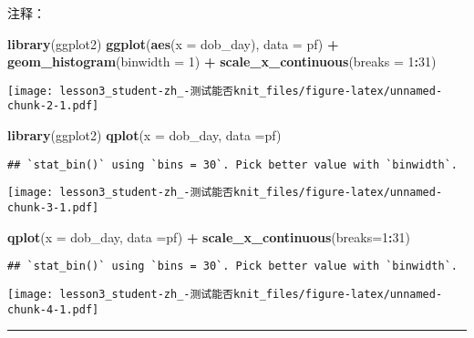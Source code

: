 \documentclass[]{article}
\newenvironment{Shaded}{\begin{snugshade}}{\end{snugshade}}
\newcommand{\DataTypeTok}[1]{\textcolor[rgb]{0.13,0.29,0.53}{#1}}
\newcommand{\DecValTok}[1]{\textcolor[rgb]{0.00,0.00,0.81}{#1}}
\newcommand{\KeywordTok}[1]{\textcolor[rgb]{0.13,0.29,0.53}{\textbf{#1}}}
\newcommand{\NormalTok}[1]{#1}
\newcommand{\OperatorTok}[1]{\textcolor[rgb]{0.81,0.36,0.00}{\textbf{#1}}}
\newcommand{\StringTok}[1]{\textcolor[rgb]{0.31,0.60,0.02}{#1}}
\begin{document}
注释：

\begin{Shaded}
\begin{Highlighting}[]
\KeywordTok{library}\NormalTok{(ggplot2)}
\KeywordTok{ggplot}\NormalTok{(}\KeywordTok{aes}\NormalTok{(}\DataTypeTok{x =}\NormalTok{ dob_day), }\DataTypeTok{data =}\NormalTok{ pf) }\OperatorTok{+}\StringTok{ }
\StringTok{  }\KeywordTok{geom_histogram}\NormalTok{(}\DataTypeTok{binwidth =} \DecValTok{1}\NormalTok{) }\OperatorTok{+}\StringTok{ }
\StringTok{  }\KeywordTok{scale_x_continuous}\NormalTok{(}\DataTypeTok{breaks =} \DecValTok{1}\OperatorTok{:}\DecValTok{31}\NormalTok{)}
\end{Highlighting}
\end{Shaded}

\texttt{[image: lesson3\_student-zh\_-测试能否knit\_files/figure-latex/unnamed-chunk-2-1.pdf]}

\begin{Shaded}
\begin{Highlighting}[]
\KeywordTok{library}\NormalTok{(ggplot2)}
\KeywordTok{qplot}\NormalTok{(}\DataTypeTok{x =}\NormalTok{ dob_day, }\DataTypeTok{data =}\NormalTok{pf)}
\end{Highlighting}
\end{Shaded}

\begin{verbatim}
## `stat_bin()` using `bins = 30`. Pick better value with `binwidth`.
\end{verbatim}

\texttt{[image: lesson3\_student-zh\_-测试能否knit\_files/figure-latex/unnamed-chunk-3-1.pdf]}

\begin{Shaded}
\begin{Highlighting}[]
\KeywordTok{qplot}\NormalTok{(}\DataTypeTok{x =}\NormalTok{ dob_day, }\DataTypeTok{data =}\NormalTok{pf) }\OperatorTok{+}
\StringTok{  }\KeywordTok{scale_x_continuous}\NormalTok{(}\DataTypeTok{breaks=}\DecValTok{1}\OperatorTok{:}\DecValTok{31}\NormalTok{)}
\end{Highlighting}
\end{Shaded}

\begin{verbatim}
## `stat_bin()` using `bins = 30`. Pick better value with `binwidth`.
\end{verbatim}

\texttt{[image: lesson3\_student-zh\_-测试能否knit\_files/figure-latex/unnamed-chunk-4-1.pdf]}

\begin{center}\rule{0.5\linewidth}{\linethickness}\end{center}
\end{document}
